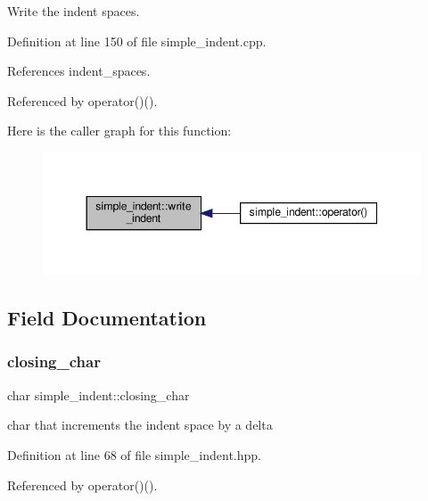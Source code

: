 Write the indent spaces. 



Definition at line 150 of file simple\+\_\+indent.\+cpp.



References indent\+\_\+spaces.



Referenced by operator()().

Here is the caller graph for this function\+:
\nopagebreak
\begin{figure}[H]
\begin{center}
\leavevmode
\includegraphics[width=344pt]{db/d73/classsimple__indent_aad9458b42a0de8b0f22dcf9c171b935f_icgraph}
\end{center}
\end{figure}


\subsection{Field Documentation}
\mbox{\label{classsimple__indent_a820d3dfc133cae5da3daf3ea1aa1c57f}} 
\subsubsection{\texorpdfstring{closing\+\_\+char}{closing\_char}}
{\footnotesize\ttfamily char simple\+\_\+indent\+::closing\+\_\+char\hspace{0.3cm}{\ttfamily [private]}}



char that increments the indent space by a delta 



Definition at line 68 of file simple\+\_\+indent.\+hpp.



Referenced by operator()().

\mbox{\label{classsimple__indent_a47dad96c1bd62b3fb2499c57b680c70d}} 
